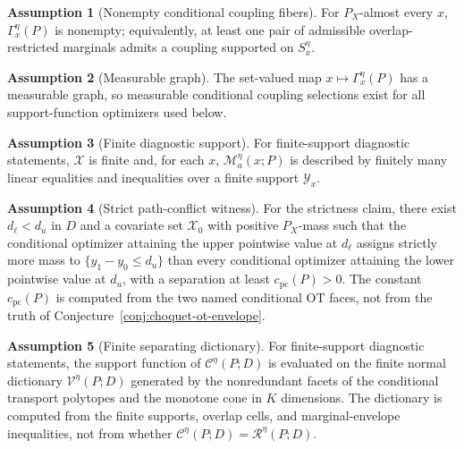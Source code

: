 \documentclass[11pt]{article}
\theoremstyle{definition}
\newtheorem{assumption}{Assumption}
\theoremstyle{plain}
\theoremstyle{remark}
\begin{document}
\begin{assumption}[Nonempty conditional coupling fibers]\label{ass:nonempty-fibers}
For \(P_X\)-almost every \(x\), \(\Gamma^\eta_x(P)\) is nonempty; equivalently, at least
one pair of admissible overlap-restricted marginals admits a coupling supported on
\(S_x^\eta\).
\end{assumption}

\begin{assumption}[Measurable graph]\label{ass:measurable-graph}
The set-valued map \(x\mapsto\Gamma^\eta_x(P)\) has a measurable graph, so measurable
conditional coupling selections exist for all support-function optimizers used below.
\end{assumption}

\begin{assumption}[Finite diagnostic support]\label{ass:finite-support}
For finite-support diagnostic statements, \(\mathcal X\) is finite and, for each \(x\),
\(\mathcal M_a^\eta(x;P)\) is described by finitely many linear equalities and
inequalities over a finite support \(\mathcal Y_x\).
\end{assumption}

\begin{assumption}[Strict path-conflict witness]\label{ass:path-conflict}
For the strictness claim, there exist \(d_\ell<d_u\) in \(D\) and a covariate set
\(\mathcal X_0\) with positive \(P_X\)-mass such that the conditional optimizer attaining
the upper pointwise value at \(d_\ell\) assigns strictly more mass to
\(\{y_1-y_0\le d_u\}\) than every conditional optimizer attaining the lower pointwise
value at \(d_u\), with a separation at least \(c_{\mathrm{pc}}(P)>0\).  The constant
\(c_{\mathrm{pc}}(P)\) is computed from the two named conditional OT faces, not from the
truth of Conjecture~\ref{conj:choquet-ot-envelope}.
\end{assumption}

\begin{assumption}[Finite separating dictionary]\label{ass:finite-dictionary}
For finite-support diagnostic statements, the support function of
\(\mathcal C^\eta(P;D)\) is evaluated on the finite normal dictionary
\(\mathcal V^\eta(P;D)\) generated by the nonredundant facets of the conditional
transport polytopes and the monotone cone in \(K\) dimensions.  The dictionary is
computed from the finite supports, overlap cells, and marginal-envelope inequalities,
not from whether \(\mathcal C^\eta(P;D)=\mathcal R^\eta(P;D)\).
\end{assumption}
\end{document}
